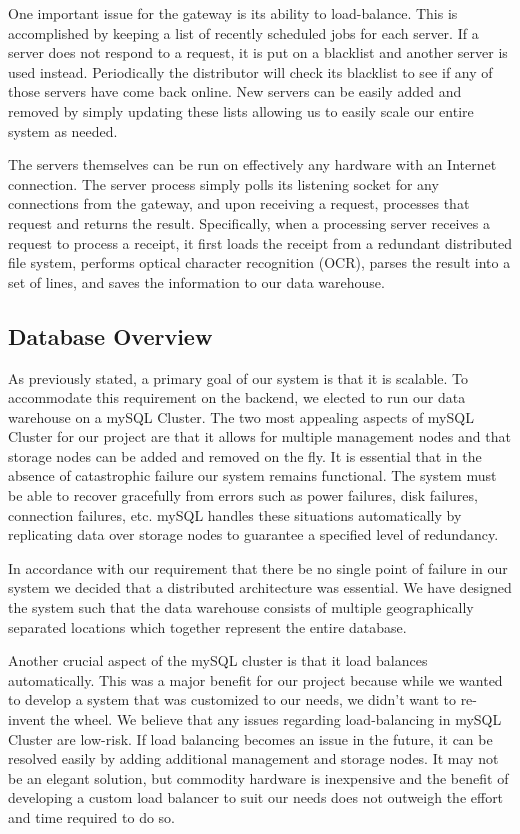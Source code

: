 One important issue for the gateway is its ability to
load-balance. This is accomplished by keeping a list of recently
scheduled jobs for each server. If a server does not respond to a
request, it is put on a blacklist and another server is used
instead. Periodically the distributor will check its blacklist to see
if any of those servers have come back online. New servers can be
easily added and removed by simply updating these lists allowing us to
easily scale our entire system as needed.

The servers themselves can be run on effectively any hardware with an
Internet connection. The server process simply polls its listening
socket for any connections from the gateway, and upon receiving a
request, processes that request and returns the result. Specifically,
when a processing server receives a request to process a receipt, it
first loads the receipt from a redundant distributed file system,
performs optical character recognition (OCR), parses the result into a
set of lines, and saves the information to our data warehouse.

\subsection{Database Overview}
\label{sec:overview.db}

As previously stated, a primary goal of our system is that it is scalable.  To accommodate this requirement on the backend, we elected to run our data warehouse on a mySQL Cluster.  The two most appealing aspects of mySQL Cluster for our project are that it allows for multiple management nodes and that storage nodes can be added and removed on the fly.  It is essential that in the absence of catastrophic failure our system remains functional.  The system must be able to recover gracefully from errors such as power failures, disk failures, connection failures, etc.  mySQL handles these situations automatically by replicating data over storage nodes to guarantee a specified level of redundancy.

In accordance with our requirement that there be no single point of failure in our system we decided that a distributed architecture was essential.  We have designed the system such that the data warehouse consists of multiple geographically separated locations which together represent the entire database.

Another crucial aspect of the mySQL cluster is that it load balances automatically.  This was a major benefit for our project because while we wanted to develop a system that was customized to our needs, we didn't want to re-invent the wheel.  We believe that any issues regarding load-balancing in mySQL Cluster are low-risk.  If load balancing becomes an issue in the future, it can be resolved easily by adding additional management and storage nodes.  It may not be an elegant solution, but commodity hardware is inexpensive and the benefit of developing a custom load balancer to suit our needs does not outweigh the effort and time required to do so.
